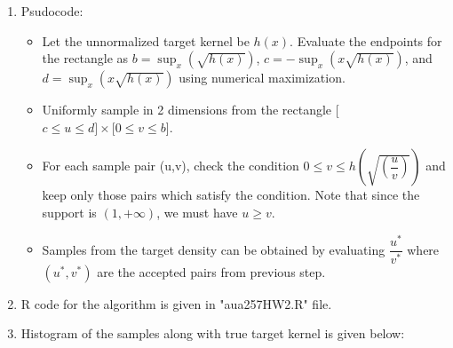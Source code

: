 \documentclass[12pt]{article}
\begin{document}
\begin{enumerate}[label=(\alph*)]
\item Psudocode:
\begin{itemize}
\item Let the unnormalized target kernel be $h(x)$. Evaluate the endpoints for the rectangle as $b=\sup_{x}(\sqrt{h(x)})$, $c=-\sup_{x}(x\sqrt{h(x)})$, and $d=\sup_{x}(x\sqrt{h(x)})$ using numerical maximization. 
\item Uniformly sample in 2 dimensions from the rectangle [$c\leq u\leq d] \times [0\leq v\leq b$].
\item For each sample pair (u,v), check the condition $0\leq v\leq h\left(\sqrt{\left(\dfrac{u}{v}\right)}\right)$ and keep only those pairs which satisfy the condition. Note that since the support is $(1,+\infty)$, we must have $u\geq v$.
\item Samples from the target density can be obtained by evaluating $\dfrac{u^{*}}{v^{*}}$ where $(u^{*},v^{*})$ are the accepted pairs from previous step.
\end{itemize}

\item R code for the algorithm is given in "aua257HW2.R" file.
\item Histogram of the samples along with true target kernel is given below:

\begin{knitrout}
\color{fgcolor}\begin{kframe}


{\ttfamily\noindent\itshape\color{messagecolor}{\#\# Loading required package: mvtnorm\\\#\# Loading required package: Matrix\\\#\# Loading required package: stats4\\\#\# Loading required package: gmm\\\#\# Loading required package: sandwich}}\end{kframe}
\end{knitrout}
\begin{figure}[H]
\begin{centering}
\begin{knitrout}
\color{fgcolor}\begin{kframe}


{\ttfamily\noindent\itshape\color{messagecolor}{\#\# stat\_bin: binwidth defaulted to range/30. Use 'binwidth = x' to adjust this.}}


\end{kframe}
\end{knitrout}
\end{centering}
\end{figure}
\end{enumerate}
\end{document}
